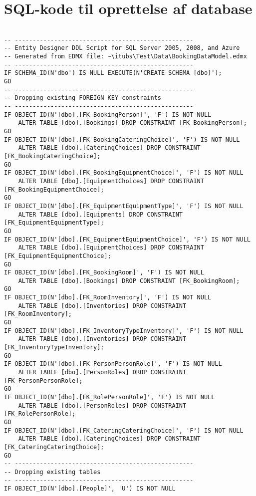 \section{SQL-kode til oprettelse af database}
\label{App_Code_DBC}
\begin{lstlisting}[label=SQL, caption= SQL-kode til oprettelse af database]

-- --------------------------------------------------
-- Entity Designer DDL Script for SQL Server 2005, 2008, and Azure
-- Generated from EDMX file: ~\itubs\Test\Data\BookingDataModel.edmx
-- --------------------------------------------------
IF SCHEMA_ID(N'dbo') IS NULL EXECUTE(N'CREATE SCHEMA [dbo]');
GO
-- --------------------------------------------------
-- Dropping existing FOREIGN KEY constraints
-- --------------------------------------------------
IF OBJECT_ID(N'[dbo].[FK_BookingPerson]', 'F') IS NOT NULL
    ALTER TABLE [dbo].[Bookings] DROP CONSTRAINT [FK_BookingPerson];
GO
IF OBJECT_ID(N'[dbo].[FK_BookingCateringChoice]', 'F') IS NOT NULL
    ALTER TABLE [dbo].[CateringChoices] DROP CONSTRAINT [FK_BookingCateringChoice];
GO
IF OBJECT_ID(N'[dbo].[FK_BookingEquipmentChoice]', 'F') IS NOT NULL
    ALTER TABLE [dbo].[EquipmentChoices] DROP CONSTRAINT [FK_BookingEquipmentChoice];
GO
IF OBJECT_ID(N'[dbo].[FK_EquipmentEquipmentType]', 'F') IS NOT NULL
    ALTER TABLE [dbo].[Equipments] DROP CONSTRAINT [FK_EquipmentEquipmentType];
GO
IF OBJECT_ID(N'[dbo].[FK_EquipmentEquipmentChoice]', 'F') IS NOT NULL
    ALTER TABLE [dbo].[EquipmentChoices] DROP CONSTRAINT [FK_EquipmentEquipmentChoice];
GO
IF OBJECT_ID(N'[dbo].[FK_BookingRoom]', 'F') IS NOT NULL
    ALTER TABLE [dbo].[Bookings] DROP CONSTRAINT [FK_BookingRoom];
GO
IF OBJECT_ID(N'[dbo].[FK_RoomInventory]', 'F') IS NOT NULL
    ALTER TABLE [dbo].[Inventories] DROP CONSTRAINT [FK_RoomInventory];
GO
IF OBJECT_ID(N'[dbo].[FK_InventoryTypeInventory]', 'F') IS NOT NULL
    ALTER TABLE [dbo].[Inventories] DROP CONSTRAINT [FK_InventoryTypeInventory];
GO
IF OBJECT_ID(N'[dbo].[FK_PersonPersonRole]', 'F') IS NOT NULL
    ALTER TABLE [dbo].[PersonRoles] DROP CONSTRAINT [FK_PersonPersonRole];
GO
IF OBJECT_ID(N'[dbo].[FK_RolePersonRole]', 'F') IS NOT NULL
    ALTER TABLE [dbo].[PersonRoles] DROP CONSTRAINT [FK_RolePersonRole];
GO
IF OBJECT_ID(N'[dbo].[FK_CateringCateringChoice]', 'F') IS NOT NULL
    ALTER TABLE [dbo].[CateringChoices] DROP CONSTRAINT [FK_CateringCateringChoice];
GO
-- --------------------------------------------------
-- Dropping existing tables
-- --------------------------------------------------
IF OBJECT_ID(N'[dbo].[People]', 'U') IS NOT NULL

\end{lstlisting}
